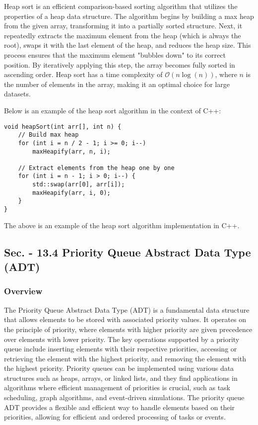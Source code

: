 Heap sort is an efficient comparison-based sorting algorithm that utilizes the properties of a heap data structure. The algorithm begins by building a max heap from the given array, transforming it into a partially 
sorted structure. Next, it repeatedly extracts the maximum element from the heap (which is always the root), swaps it with the last element of the heap, and reduces the heap size. This process ensures that the maximum 
element "bubbles down" to its correct position. By iteratively applying this step, the array becomes fully sorted in ascending order. Heap sort has a time complexity of $\mathcal{O}(n\log{(n)})$, where $n$ is the number 
of elements in the array, making it an optimal choice for large datasets.

\begin{solution}

Below is an example of the heap sort algorithm in the context of C++:

\horizontalline

\begin{verbatim}
void heapSort(int arr[], int n) {
    // Build max heap
    for (int i = n / 2 - 1; i >= 0; i--)
        maxHeapify(arr, n, i);

    // Extract elements from the heap one by one
    for (int i = n - 1; i > 0; i--) {
        std::swap(arr[0], arr[i]);
        maxHeapify(arr, i, 0);
    }
}
\end{verbatim}

\horizontalline

The above is an example of the heap sort algorithm implementation in C++.

\end{solution}

\subsection*{Sec. - 13.4 Priority Queue Abstract Data Type (ADT)}

\subsubsection{Overview}

The Priority Queue Abstract Data Type (ADT) is a fundamental data structure that allows elements to be stored with associated priority values. It operates on the principle of priority, where elements 
with higher priority are given precedence over elements with lower priority. The key operations supported by a priority queue include inserting elements with their respective priorities, accessing or 
retrieving the element with the highest priority, and removing the element with the highest priority. Priority queues can be implemented using various data structures such as heaps, arrays, or linked 
lists, and they find applications in algorithms where efficient management of priorities is crucial, such as task scheduling, graph algorithms, and event-driven simulations. The priority queue ADT 
provides a flexible and efficient way to handle elements based on their priorities, allowing for efficient and ordered processing of tasks or events.

